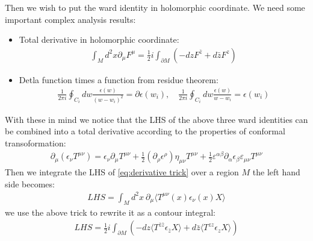 Then we wish to put the ward identity in holomorphic coordinate. We need some important complex analysis results:
\begin{itemize}
  \item Total derivative in holomorphic coordinate:
    \begin{align}
      \int_{M}d^{2}x\partial_{\mu}F^{\mu}=\frac{1}{2}i\int_{\partial M}\left(-dzF^{\bar{z}}+d\bar{z}F^{z}\right)
    \end{align}
    \item Detla function times a function from residue theorem:
      \begin{align}
  \frac{1}{2\pi i}\oint_{C_i}dw\frac{\epsilon(w)}{(w-w_i)^2}=\partial\epsilon(w_i),\quad\frac{1}{2\pi i}\oint_{C_i}dw\frac{\epsilon(w)}{w-w_i}=\epsilon(w_i)
      \end{align}
\end{itemize}
With these in mind we notice that the LHS of the above three ward identities can be combined into a total derivative according to the properties of conformal transoformation:
\begin{align}\label{eq:derivative trick}
  \partial_\mu(\epsilon_\nu T^{\mu\nu})=\epsilon_\nu\partial_\mu T^{\mu\nu}+\frac{1}{2}(\partial_\rho\epsilon^\rho)\eta_{\mu\nu}T^{\mu\nu}+\frac{1}{2}\varepsilon^{\alpha\beta}\partial_\alpha\epsilon_\beta\varepsilon_{\mu\nu}T^{\mu\nu}
\end{align}
Then we integrate the LHS of \cref{eq:derivative trick} over a region $ M $ the left hand side becomes:
\begin{align}
  LHS=\int_Md^2x\mathrm{~}\partial_\mu\langle T^{\mu\nu}(x)\epsilon_\nu(x)X\rangle
\end{align}
we use the above trick to rewrite it as a contour integral:
\begin{align}
  LHS = \frac{1}{2}i\int_{\partial M}\left(-dz\langle T^{\bar{z}\bar{z}}\epsilon_{\bar{z}}X\rangle+d\bar{z}\langle T^{zz}\epsilon_{z}X\rangle\right)
\end{align}
